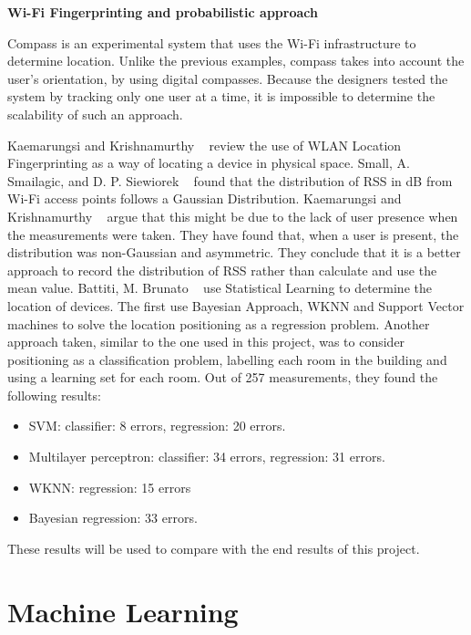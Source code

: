 \medskip
\noindent \textbf{Wi-Fi Fingerprinting and probabilistic approach}

Compass \cite{King} is an experimental system that uses the Wi-Fi infrastructure to determine location. Unlike the previous examples, compass takes into account the user’s orientation, by using digital compasses. Because the designers tested the system by tracking only one user at a time, it is impossible to determine the scalability of such an approach.

Kaemarungsi and Krishnamurthy ~\cite{Kaemarungsi} review the use of WLAN Location Fingerprinting as a way of locating a device in physical space. Small, A. Smailagic, and D. P. Siewiorek ~\cite{Small} found that the distribution of RSS in dB from Wi-Fi access points follows a Gaussian Distribution. Kaemarungsi and Krishnamurthy ~\cite{Kaemarungsi} argue that this might be due to the lack of user presence when the measurements were taken. They have found that, when a user is present, the distribution was non-Gaussian and asymmetric. They conclude that it is a better approach to record the distribution of RSS rather than calculate and use the mean value. 
Battiti, M. Brunato ~\cite{Battiti} use Statistical Learning to determine the location of devices. The first use Bayesian Approach, WKNN and Support Vector machines to solve the location positioning as a regression problem. Another approach taken, similar to the one used in this project, was to consider positioning as a classification problem, labelling each room in the building and using a learning set for each room. Out of 257 measurements, they found the following results:
\begin{itemize}
\item SVM: classifier: 8 errors, regression: 20 errors.
\item Multilayer perceptron: classifier: 34 errors, regression: 31 errors.
\item WKNN: regression: 15 errors
\item Bayesian regression: 33 errors.
\end{itemize}
These results will be used to compare with the end results of this project.

\section{Machine Learning}

